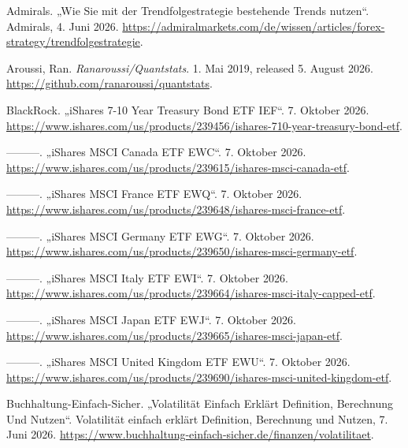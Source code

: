 \documentclass[
  ngerman,
  a4paper,
  DIV=11,
  oneside]{scrreprt}
\newlength{\cslhangindent}
\newenvironment{CSLReferences}[2] %
 {\begin{list}{}{%
  \setlength{\itemindent}{0pt}
  \setlength{\leftmargin}{0pt}
  \setlength{\parsep}{0pt}
  \ifodd #1
   \setlength{\leftmargin}{\cslhangindent}
   \setlength{\itemindent}{-1\cslhangindent}
  \fi
  \setlength{\itemsep}{#2\baselineskip}}}
 {\end{list}}
\begin{document}
\protect{}\label{refs}
\begin{CSLReferences}{1}{1}
Admirals. {„Wie Sie mit der Trendfolgestrategie bestehende Trends
nutzen``}. Admirals, 4. Juni 2026.
\url{https://admiralmarkets.com/de/wissen/articles/forex-strategy/trendfolgestrategie}.

Aroussi, Ran. \emph{Ranaroussi/Quantstats}. 1. Mai 2019, released 5.
August 2026. \url{https://github.com/ranaroussi/quantstats}.

BlackRock. {„{iShares} 7-10 {Year Treasury Bond ETF} \textbar{}
{IEF}``}. 7. Oktober 2026.
\url{https://www.ishares.com/us/products/239456/ishares-710-year-treasury-bond-etf}.

---------. {„{iShares MSCI Canada ETF} \textbar{} {EWC}``}. 7. Oktober
2026.
\url{https://www.ishares.com/us/products/239615/ishares-msci-canada-etf}.

---------. {„{iShares MSCI France ETF} \textbar{} {EWQ}``}. 7. Oktober
2026.
\url{https://www.ishares.com/us/products/239648/ishares-msci-france-etf}.

---------. {„{iShares MSCI Germany ETF} \textbar{} {EWG}``}. 7. Oktober
2026.
\url{https://www.ishares.com/us/products/239650/ishares-msci-germany-etf}.

---------. {„{iShares MSCI Italy ETF} \textbar{} {EWI}``}. 7. Oktober
2026.
\url{https://www.ishares.com/us/products/239664/ishares-msci-italy-capped-etf}.

---------. {„{iShares MSCI Japan ETF} \textbar{} {EWJ}``}. 7. Oktober
2026.
\url{https://www.ishares.com/us/products/239665/ishares-msci-japan-etf}.

---------. {„{iShares MSCI United Kingdom ETF} \textbar{} {EWU}``}. 7.
Oktober 2026.
\url{https://www.ishares.com/us/products/239690/ishares-msci-united-kingdom-etf}.

Buchhaltung-Einfach-Sicher. {„Volatilität Einfach Erklärt \textbar{}
{Definition}, {Berechnung} Und {Nutzen}``}. Volatilität einfach erklärt
\textbar{} Definition, Berechnung und Nutzen, 7. Juni 2026.
\url{https://www.buchhaltung-einfach-sicher.de/finanzen/volatilitaet}.


\end{CSLReferences}
\end{document}
